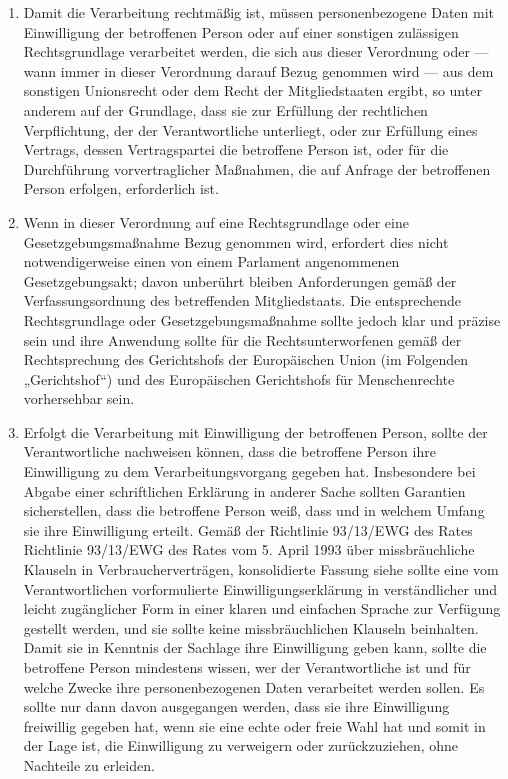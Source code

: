 \begin{enumerate}

   \item Damit die Verarbeitung rechtmäßig ist, müssen personenbezogene Daten mit Einwilligung der betroffenen Person
    oder auf einer sonstigen zulässigen Rechtsgrundlage verarbeitet werden, die sich aus dieser Verordnung oder — wann
    immer in dieser Verordnung darauf Bezug genommen wird — aus dem sonstigen Unionsrecht oder dem Recht der
    Mitgliedstaaten ergibt, so unter anderem auf der Grundlage, dass sie zur Erfüllung der rechtlichen Verpflichtung,
    der der Verantwortliche unterliegt, oder zur Erfüllung eines Vertrags, dessen Vertragspartei die betroffene Person
    ist, oder für die Durchführung vorvertraglicher Maßnahmen, die auf Anfrage der betroffenen Person erfolgen,
    erforderlich ist.%
   \label{itm:eg-40}
   

   \item Wenn in dieser Verordnung auf eine Rechtsgrundlage oder eine Gesetzgebungsmaßnahme Bezug genommen wird,
    erfordert dies nicht notwendigerweise einen von einem Parlament angenommenen Gesetzgebungsakt; davon unberührt
    bleiben Anforderungen gemäß der Verfassungsordnung des betreffenden Mitgliedstaats. Die entsprechende
    Rechtsgrundlage oder Gesetzgebungsmaßnahme sollte jedoch klar und präzise sein und ihre Anwendung sollte für die
    Rechtsunterworfenen gemäß der Rechtsprechung des Gerichtshofs der Europäischen Union (im Folgenden „Gerichtshof“)
    und des Europäischen Gerichtshofs für Menschenrechte vorhersehbar sein.%
   \label{itm:eg-41}
   

   \item Erfolgt die Verarbeitung mit Einwilligung der betroffenen Person, sollte der Verantwortliche nachweisen können,
    dass die betroffene Person ihre Einwilligung zu dem Verarbeitungsvorgang gegeben hat. Insbesondere bei Abgabe einer
    schriftlichen Erklärung in anderer Sache sollten Garantien sicherstellen, dass die betroffene Person weiß, dass und
    in welchem Umfang sie ihre Einwilligung erteilt. Gemäß der Richtlinie 93/13/EWG des Rates\comment
    {Richtlinie 93/13/EWG des Rates vom 5. April 1993 über missbräuchliche Klauseln in Verbraucherverträgen,
    konsolidierte Fassung siehe \cite{ril-mk-vv}} sollte eine vom Verantwortlichen vorformulierte
    Einwilligungserklärung in verständlicher und leicht zugänglicher Form in einer klaren und einfachen Sprache zur
    Verfügung gestellt werden, und sie sollte keine missbräuchlichen Klauseln beinhalten. Damit sie in Kenntnis der
    Sachlage ihre Einwilligung geben kann, sollte die betroffene Person mindestens wissen, wer der Verantwortliche ist
    und für welche Zwecke ihre personenbezogenen Daten verarbeitet werden sollen. Es sollte nur dann davon ausgegangen
    werden, dass sie ihre Einwilligung freiwillig gegeben hat, wenn sie eine echte oder freie Wahl hat und somit in der
    Lage ist, die Einwilligung zu verweigern oder zurückzuziehen, ohne Nachteile zu erleiden.%
   \label{itm:eg-42}
   

\end{enumerate}
